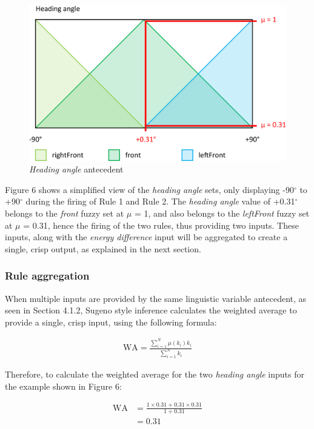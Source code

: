 \begin{figure}[H]
\centering
\caption{\emph{Heading angle} antecedent}
\includegraphics[scale=0.1]{./img/pdf/turnRule_headingAngle.pdf}
\end{figure}

Figure 6 shows a simplified view of the \emph{heading angle} sets, only displaying -90$^{\circ}$ to +90$^{\circ}$ during the firing of Rule 1 and Rule 2. The \emph{heading angle} value of +0.31$^{\circ}$ belongs to the \emph{front} fuzzy set at $\mu$ = 1, and also belongs to the \emph{leftFront} fuzzy set at $\mu$ = 0.31, hence the firing of the two rules, thus providing two inputs. These inputs, along with the \emph{energy difference} input will be aggregated to create a single, crisp output, as explained in the next section.

\subsubsection{Rule aggregation}

When multiple inputs are provided by the same linguistic variable antecedent, as seen in Section 4.1.2, Sugeno style inference calculates the weighted average to provide a single, crisp input, using the following formula:

{\LARGE
	\begin{align}
	\mbox{WA} = \frac{\sum^N_{i=1} \mu(k_i) k_i}{\sum^N_{i=1} k_i}
	\end{align}
}

\noindent
Therefore, to calculate the weighted average for the two \emph{heading angle} inputs for the example shown in Figure 6:

{\LARGE
	\begin{align}
	\mbox{WA} &= \frac{1 \times 0.31 + 0.31 \times 0.31}{1 + 0.31} \\
	&= 0.31
	\end{align}
}

